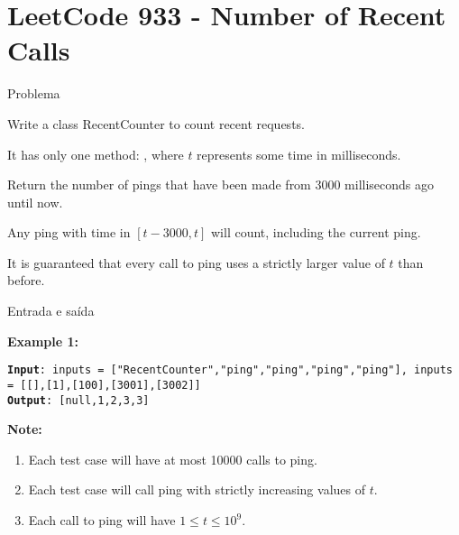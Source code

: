 \section{LeetCode 933 - Number of Recent Calls}

\begin{frame}[fragile]{Problema}

Write a class RecentCounter to count recent requests.

It has only one method: , where $t$ represents some time in milliseconds.

Return the number of pings that have been made from 3000 milliseconds ago until now.

Any ping with time in $[t - 3000, t]$ will count, including the current ping.

It is guaranteed that every call to ping uses a strictly larger value of $t$ than before.

\end{frame}

\begin{frame}[fragile]{Entrada e saída}

\textbf{Example 1:}

\begin{small}
\texttt{\noindent \textbf{Input}: inputs = ["RecentCounter","ping","ping","ping","ping"], inputs = [[],[1],[100],[3001],[3002]] \\
\noindent \textbf{Output}: [null,1,2,3,3] 
}
\end{small}

\vspace{0.1in}

\textbf{Note:}

\begin{enumerate}
    \item Each test case will have at most 10000 calls to ping.
    \item Each test case will call ping with strictly increasing values of $t$.
    \item Each call to ping will have $1 \leq t \leq 10^9$.
\end{enumerate}

\end{frame}

